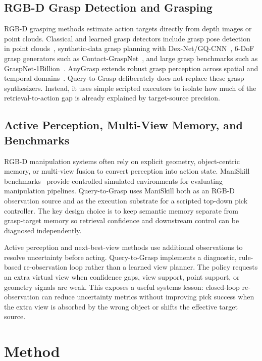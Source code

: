 \documentclass[conference]{IEEEtran}
\begin{document}
\subsection{RGB-D Grasp Detection and Grasping}

RGB-D grasping methods estimate action targets directly from depth images or
point clouds. Classical and learned grasp detectors include grasp pose
detection in point clouds~\cite{tenpas2017gpd}, synthetic-data grasp planning
with Dex-Net/GQ-CNN~\cite{mahler2017dexnet}, 6-DoF grasp generators such as
Contact-GraspNet~\cite{sundermeyer2021contactgraspnet}, and large grasp
benchmarks such as GraspNet-1Billion~\cite{fang2023graspnet}. AnyGrasp extends
robust grasp perception across spatial and temporal domains~\cite{fang2023anygrasp}.
Query-to-Grasp deliberately does not replace these grasp synthesizers. Instead,
it uses simple scripted executors to isolate how much of the retrieval-to-action
gap is already explained by target-source precision.

\subsection{Active Perception, Multi-View Memory, and Benchmarks}

RGB-D manipulation systems often rely on explicit geometry, object-centric
memory, or multi-view fusion to convert perception into action state. ManiSkill
benchmarks~\cite{gu2023maniskill2} provide controlled simulated environments
for evaluating manipulation pipelines. Query-to-Grasp uses ManiSkill both as
an RGB-D observation source and as the execution substrate for a scripted
top-down pick controller. The key design choice is to keep semantic memory
separate from grasp-target memory so retrieval confidence and downstream
control can be diagnosed independently.

Active perception and next-best-view methods use additional observations to
resolve uncertainty before acting. Query-to-Grasp implements a diagnostic,
rule-based re-observation loop rather than a learned view planner. The policy
requests an extra virtual view when confidence gaps, view support, point
support, or geometry signals are weak. This exposes a useful systems lesson:
closed-loop re-observation can reduce uncertainty metrics without improving
pick success when the extra view is absorbed by the wrong object or shifts the
effective target source.

\section{Method}
\end{document}
